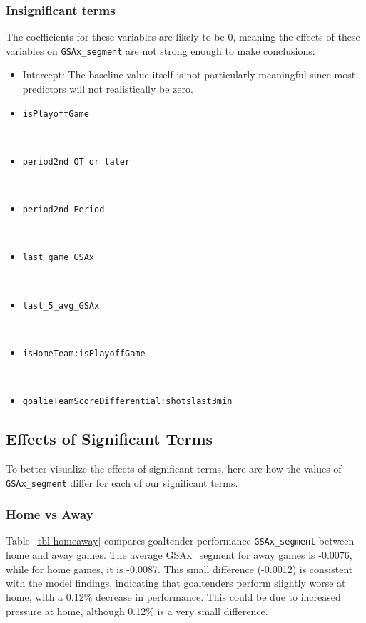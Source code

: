 \documentclass[
  letterpaper,
  DIV=11,
  numbers=noendperiod]{scrartcl}
\providecommand{\tightlist}{%
  \setlength{\itemsep}{0pt}\setlength{\parskip}{0pt}}\usepackage{longtable,booktabs,array}
\begin{document}
\subsubsection{Insignificant terms}\label{insignificant-terms}

The coefficients for these variables are likely to be 0, meaning the
effects of these variables on \texttt{GSAx\_segment} are not strong
enough to make conclusions:

\begin{itemize}
\tightlist
\item
  Intercept: The baseline value itself is not particularly meaningful
  since most predictors will not realistically be zero.
\item
  \texttt{isPlayoffGame}\strut \\
\item
  \texttt{period2nd\ OT\ or\ later}\strut \\
\item
  \texttt{period2nd\ Period}\strut \\
\item
  \texttt{last\_game\_GSAx}\strut \\
\item
  \texttt{last\_5\_avg\_GSAx}\strut \\
\item
  \texttt{isHomeTeam:isPlayoffGame}\strut \\
\item
  \texttt{goalieTeamScoreDifferential:shotslast3min}
\end{itemize}

\subsection{Effects of Significant
Terms}\label{effects-of-significant-terms}

To better visualize the effects of significant terms, here are how the
values of \texttt{GSAx\_segment} differ for each of our significant
terms.

\subsubsection{Home vs Away}\label{home-vs-away}

Table~\ref{tbl-homeaway} compares goaltender performance
\texttt{GSAx\_segment} between home and away games. The average
GSAx\_segment for away games is -0.0076, while for home games, it is
-0.0087. This small difference (-0.0012) is consistent with the model
findings, indicating that goaltenders perform slightly worse at home,
with a 0.12\% decrease in performance. This could be due to increased
pressure at home, although 0.12\% is a very small difference.
\end{document}

